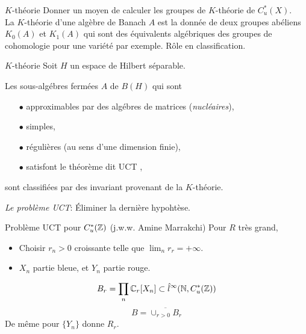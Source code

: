 \begin{frame}{$K$-th\'eorie}
Donner un moyen de calculer les groupes de $K$-th\'eorie de $C^*_u(X)$.\\
\vfill
La $K$-th\'eorie d'une alg\`ebre de Banach $A$ est la donn\'ee de deux groupes ab\'eliens $K_0(A)$ et $K_1(A)$ qui sont des \'equivalents alg\'ebriques des groupes de cohomologie pour une vari\'et\'e par exemple.  
\vfill
R\^{o}le en classification.\\
\vfill

\end{frame}

\begin{frame}{$K$-th\'eorie}
Soit $H$ un espace de Hilbert s\'eparable.
\vfill
\begin{theorem}
Les sous-alg\'ebres ferm\'ees $A$ de $B(H)$ qui sont
\begin{itemize}
\item[$\bullet$] approximables par des alg\'ebres de matrices (\textit{nucl\'eaires}),
\item[$\bullet$] simples,
\item[$\bullet$] r\'eguli\`eres (au sens d'une dimension finie),
\item[$\bullet$] satisfont le th\'eor\`eme dit UCT ,
\end{itemize}
sont classifi\'ees par des invariant provenant de la $K$-th\'eorie.
\end{theorem} 
\vfill
\textit{Le probl\`eme UCT}: \'Eliminer la derni\`ere hypoht\`ese.
\end{frame}

\begin{frame}{Probl\`eme UCT pour $C^*_u(\mathbb Z)$ (j.w.w. Amine Marrakchi)}
Pour $R$ tr\`es grand,
\begin{center}
\end{center}
\begin{itemize}
\item Choisir $r_n>0$ croissante telle que $\lim_n r_r = +\infty$.
\item $X_n$ partie bleue, et $Y_n$ partie rouge.
\end{itemize}
\[ B_r= \prod_n \mathbb C_r[X_n] \subset \hat l^\infty (\mathbb N , C^*_u(\mathbb Z))\]
\[B = \overline{\cup_{r>0} B_r}\]
De m\^eme pour $\{Y_n\}$ donne $R_r$.
\end{frame}



